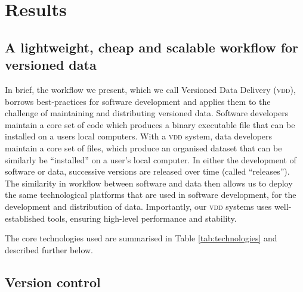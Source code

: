\documentclass[a4paper,11pt]{article}
\begin{document}

\section{Results}

\subsection{A lightweight, cheap and scalable workflow for versioned data}


In brief, the workflow we present, which we call Versioned Data Delivery (\textsc{vdd}), borrows best-practices for software development \cite{Perez-Riverol-2016} and applies them to the challenge of maintaining and distributing versioned data. Software developers maintain a core set of code which produces a binary executable file that can be installed on a users local  computers. With a \textsc{vdd} system, data developers maintain a core set of files, which produce an organised dataset that can be similarly be ``installed'' on a user's local computer. In either the development of software or data, successive versions are released over time (called ``releases''). The similarity in workflow between software and data then allows us to deploy the same technological platforms that are used in software development, for the development and distribution of data. Importantly, our \textsc{vdd} systems uses well-established tools, ensuring high-level performance and stability.

The core technologies used are summarised in Table \ref{tab:technologies} and described further below.

\subsection{Version control}
\end{document}
